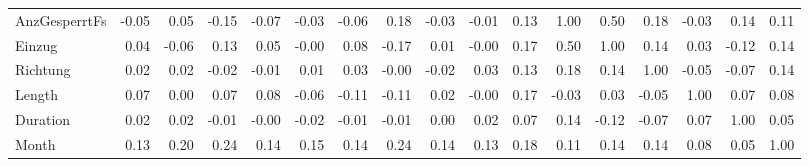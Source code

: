 \begin{tabular}{lrrrrrrrrrrrrrrrr}
AnzGesperrtFs &    -0.05 &     0.05 &    -0.15 &    -0.07 &     -0.03 &     -0.06 &      0.18 &  -0.03 &  -0.01 &     0.13 &           1.00 &    0.50 &      0.18 &   -0.03 &      0.14 &   0.11 \\
Einzug        &     0.04 &    -0.06 &     0.13 &     0.05 &     -0.00 &      0.08 &     -0.17 &   0.01 &  -0.00 &     0.17 &           0.50 &    1.00 &      0.14 &    0.03 &     -0.12 &   0.14 \\
Richtung      &     0.02 &     0.02 &    -0.02 &    -0.01 &      0.01 &      0.03 &     -0.00 &  -0.02 &   0.03 &     0.13 &           0.18 &    0.14 &      1.00 &   -0.05 &     -0.07 &   0.14 \\
Length        &     0.07 &     0.00 &     0.07 &     0.08 &     -0.06 &     -0.11 &     -0.11 &   0.02 &  -0.00 &     0.17 &          -0.03 &    0.03 &     -0.05 &    1.00 &      0.07 &   0.08 \\
Duration      &     0.02 &     0.02 &    -0.01 &    -0.00 &     -0.02 &     -0.01 &     -0.01 &   0.00 &   0.02 &     0.07 &           0.14 &   -0.12 &     -0.07 &    0.07 &      1.00 &   0.05 \\
Month         &     0.13 &     0.20 &     0.24 &     0.14 &      0.15 &      0.14 &      0.24 &   0.14 &   0.13 &     0.18 &           0.11 &    0.14 &      0.14 &    0.08 &      0.05 &   1.00 \\
\bottomrule
\end{tabular}
